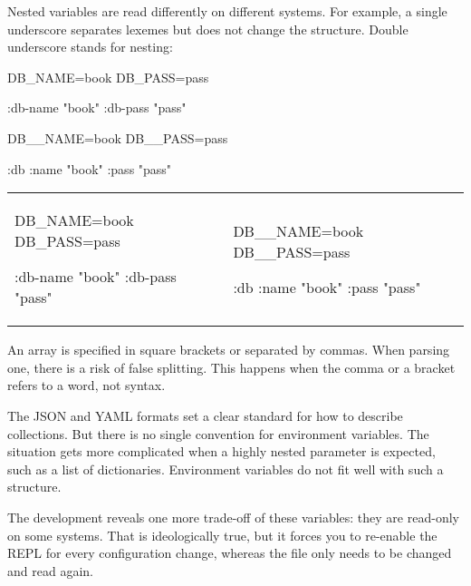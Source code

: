 Nested variables are read differently on different systems. For example, a single underscore separates lexemes but does not change the structure. Double underscore stands for nesting:

\ifnarrow

\begin{clojure}
DB_NAME=book
DB_PASS=pass

{:db-name "book"
 :db-pass "pass"}
\end{clojure}

\splitter

\begin{clojure}
DB__NAME=book
DB__PASS=pass

{:db {:name "book"
      :pass "pass"}}
\end{clojure}

\else


\noindent
\begin{tabular}{ @{}p{5cm} @{}p{5cm} }

\begin{clojure}
DB_NAME=book
DB_PASS=pass

{:db-name "book"
 :db-pass "pass"}
\end{clojure}

&

\begin{clojure}
DB__NAME=book
DB__PASS=pass

{:db {:name "book"
      :pass "pass"}}
\end{clojure}

\end{tabular}


\fi


An array is specified in square brackets or separated by commas. When parsing one, there is a risk of false splitting. This happens when the comma or a bracket refers to a word, not syntax.


The JSON and YAML formats set a clear standard for how to describe collections. But there is no single convention for environment variables. The situation gets more complicated when a highly nested parameter is expected, such as a list of dictionaries. Environment variables do not fit well with such a structure.

The development reveals one more trade-off of these variables: they are read-only on some systems. That is ideologically true, but it forces you to re-enable the REPL for every configuration change, whereas the file only needs to be changed and read again.

